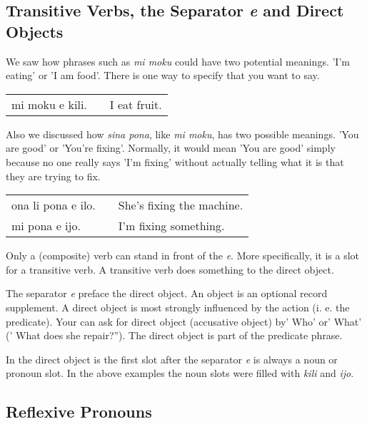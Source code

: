 %
\subsection*{Transitive Verbs, the Separator \textit{e} and Direct Objects}
%
We saw how phrases such as \textit{mi moku} could have two potential meanings. 
'I'm eating' or 'I am food'. 
There is one way to specify that you want to say. 

\begin{supertabular}{p{5,5cm}|ll}
mi moku e kili. && I eat fruit. \\
\end{supertabular} 

Also we discussed how \textit{sina pona}, like \textit{mi moku}, has two possible meanings. 'You are good' or 'You're fixing'. 
Normally, it would mean 'You are good' simply because no one really says 'I'm fixing' without actually telling what it is that they are trying to fix. 

\begin{supertabular}{p{5,5cm}|ll}
ona li pona e ilo. && She's fixing the machine. \\
mi pona e ijo. && I'm fixing something. \\
\end{supertabular} 

Only a (composite) verb can stand in front of the \textit{e}. 
More specifically, it is a slot for a transitive verb. 
A transitive verb does something to the direct object. 

The separator \textit{e} preface the direct object.
An object is an optional record supplement. 
A direct object is most strongly influenced by the action (i. e. the predicate).
Your can ask for direct object (accusative object) by' Who' or' What' (' What does she repair?'').
The direct object is part of the predicate phrase. 

In the direct object is the first slot after the separator \textit{e} is always a noun or pronoun slot.
In the above examples the noun slots were filled with \textit{kili} and \textit{ijo}. 

%
\subsection*{Reflexive Pronouns}


